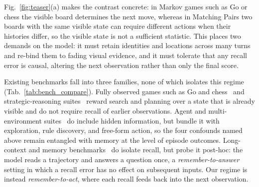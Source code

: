 Fig.~\ref{fig:teaser}(a) makes the contrast concrete: in Markov games such as Go or chess the visible board determines the next move, whereas in Matching Pairs two boards with the same visible state can require different actions when their histories differ, so the visible state is not a sufficient statistic. This places two demands on the model: it must retain identities and locations across many turns and re-bind them to fading visual evidence, and it must tolerate that any recall error is causal, altering the next observation rather than only the final score.

Existing benchmarks fall into three families, none of which isolates this regime (Tab.~\ref{tab:bench_compare}). Fully observed games such as Go and chess~\citep{silver2018general} and strategic-reasoning suites~\citep{costarelli2024gamebench, duan2024gtbench} reward search and planning over a state that is already visible and do not require recall of earlier observations. Agent and multi-environment suites~\citep{liu2023agentbench, wu2024smartplay, paglieri2024balrog, light2023avalonbench, hu2025lmgamebench, ouyang2026gameworld, pan2023machiavelli, chalamalasetti2023clembench, guertler2025textarena} do include hidden information, but bundle it with exploration, rule discovery, and free-form action, so the four confounds named above remain entangled with memory at the level of episode outcomes. Long-context and memory benchmarks~\citep{bai2023longbench, hsieh2024ruler, maharana2024locomo, wu2024longmemeval, li2026emembench, creation_2025_ICCV} do isolate recall, but probe it post-hoc: the model reads a trajectory and answers a question once, a \emph{remember-to-answer} setting in which a recall error has no effect on subsequent inputs. Our regime is instead \emph{remember-to-act}, where each recall feeds back into the next observation.

